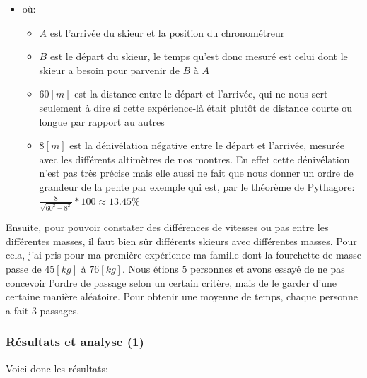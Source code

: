 \documentclass{article}
\begin{document}
\begin{center}
\end{center}
\begin{itemize}
    \item où:
    \begin{itemize}
        \item $A$ est l'arrivée du skieur et la position du chronométreur
        \item $B$ est le départ du skieur, le temps qu'est donc mesuré est celui dont le skieur a besoin pour parvenir de $B$ à $A$
        \item $60[m]$ est la distance entre le départ et l'arrivée, qui ne nous sert seulement à dire si cette expérience-là était plutôt de distance courte ou longue par rapport au autres
        \item $8[m]$ est la dénivélation négative entre le départ et l'arrivée, mesurée avec les différents altimètres de nos montres. En effet cette dénivélation n'est pas très précise mais elle aussi ne fait que nous donner un ordre de grandeur de la pente par exemple qui est, par le théorème de Pythagore: $\frac{8}{\sqrt{60^2-8^2}}*100 \approx 13.45\%$
    \end{itemize}
\end{itemize}

Ensuite, pour pouvoir constater des différences de vitesses ou pas entre les différentes masses, il faut bien sûr différents skieurs avec différentes masses. Pour cela, j'ai pris pour ma première expérience ma famille dont la fourchette de masse passe de $45[kg]$ à $76[kg]$. Nous étions $5$ personnes et avons essayé de ne pas concevoir l'ordre de passage selon un certain critère, mais de le garder d'une certaine manière aléatoire. Pour obtenir une moyenne de temps, chaque personne a fait 3 passages.

\subsubsection{Résultats et analyse (1)}

Voici donc les résultats:
\end{document}
